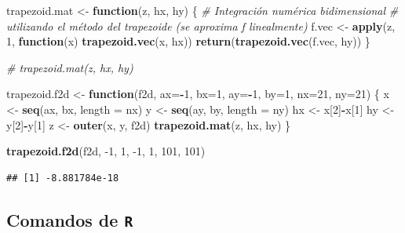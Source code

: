 \documentclass[
]{book}
\newenvironment{Shaded}{\begin{snugshade}}{\end{snugshade}}
\newcommand{\CommentTok}[1]{\textcolor[rgb]{0.56,0.35,0.01}{\textit{#1}}}
\newcommand{\ControlFlowTok}[1]{\textcolor[rgb]{0.13,0.29,0.53}{\textbf{#1}}}
\newcommand{\DataTypeTok}[1]{\textcolor[rgb]{0.13,0.29,0.53}{#1}}
\newcommand{\DecValTok}[1]{\textcolor[rgb]{0.00,0.00,0.81}{#1}}
\newcommand{\KeywordTok}[1]{\textcolor[rgb]{0.13,0.29,0.53}{\textbf{#1}}}
\newcommand{\NormalTok}[1]{#1}
\newcommand{\OperatorTok}[1]{\textcolor[rgb]{0.81,0.36,0.00}{\textbf{#1}}}
\newcommand{\StringTok}[1]{\textcolor[rgb]{0.31,0.60,0.02}{#1}}
\theoremstyle{break}
\theoremstyle{definition}
\theoremstyle{definition}
\theoremstyle{definition}
\theoremstyle{remark}
\begin{document}
\begin{Shaded}
\begin{Highlighting}[]
\NormalTok{trapezoid.mat <-}\StringTok{ }\ControlFlowTok{function}\NormalTok{(z, hx, hy) \{ }
\CommentTok{# Integración numérica bidimensional}
\CommentTok{# utilizando el método del trapezoide (se aproxima f linealmente)}
\NormalTok{  f.vec <-}\StringTok{ }\KeywordTok{apply}\NormalTok{(z, }\DecValTok{1}\NormalTok{, }\ControlFlowTok{function}\NormalTok{(x) }\KeywordTok{trapezoid.vec}\NormalTok{(x, hx))}
  \KeywordTok{return}\NormalTok{(}\KeywordTok{trapezoid.vec}\NormalTok{(f.vec, hy)) }
\NormalTok{\}}

\CommentTok{# trapezoid.mat(z, hx, hy) }

\NormalTok{trapezoid.f2d <-}\StringTok{ }\ControlFlowTok{function}\NormalTok{(f2d, }\DataTypeTok{ax=}\OperatorTok{-}\DecValTok{1}\NormalTok{, }\DataTypeTok{bx=}\DecValTok{1}\NormalTok{, }\DataTypeTok{ay=}\OperatorTok{-}\DecValTok{1}\NormalTok{, }\DataTypeTok{by=}\DecValTok{1}\NormalTok{, }\DataTypeTok{nx=}\DecValTok{21}\NormalTok{, }\DataTypeTok{ny=}\DecValTok{21}\NormalTok{) \{ }
\NormalTok{  x <-}\StringTok{ }\KeywordTok{seq}\NormalTok{(ax, bx, }\DataTypeTok{length =}\NormalTok{ nx)}
\NormalTok{  y <-}\StringTok{ }\KeywordTok{seq}\NormalTok{(ay, by, }\DataTypeTok{length =}\NormalTok{ ny)}
\NormalTok{  hx <-}\StringTok{ }\NormalTok{x[}\DecValTok{2}\NormalTok{]}\OperatorTok{-}\NormalTok{x[}\DecValTok{1}\NormalTok{]}
\NormalTok{  hy <-}\StringTok{ }\NormalTok{y[}\DecValTok{2}\NormalTok{]}\OperatorTok{-}\NormalTok{y[}\DecValTok{1}\NormalTok{]}
\NormalTok{  z <-}\StringTok{ }\KeywordTok{outer}\NormalTok{(x, y, f2d)}
  \KeywordTok{trapezoid.mat}\NormalTok{(z, hx, hy)}
\NormalTok{\}}

\KeywordTok{trapezoid.f2d}\NormalTok{(f2d, }\DecValTok{-1}\NormalTok{, }\DecValTok{1}\NormalTok{, }\DecValTok{-1}\NormalTok{, }\DecValTok{1}\NormalTok{, }\DecValTok{101}\NormalTok{, }\DecValTok{101}\NormalTok{) }
\end{Highlighting}
\end{Shaded}

\begin{verbatim}
## [1] -8.881784e-18
\end{verbatim}

\hypertarget{comandos-de-r-1}{%
\subsection{\texorpdfstring{Comandos de \texttt{R}}{Comandos de R}}\label{comandos-de-r-1}}
\end{document}
